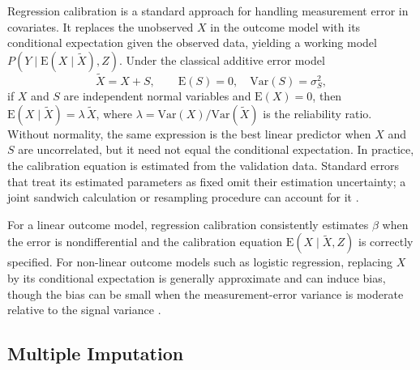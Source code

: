 Regression calibration \citep{prentice1982covariate} is a standard approach for handling measurement error in covariates. It replaces the unobserved $X$ in the outcome model with its conditional expectation given the observed data, yielding a working model $P(Y \mid \mathrm{E}(X \mid \tilde{X}), Z)$. Under the classical additive error model
\begin{equation}
    \tilde{X} = X + S, \qquad
    \mathrm{E}(S) = 0, \quad
    \mathrm{Var}(S) = \sigma_S^2,
    \label{eq:me}
\end{equation}
if $X$ and $S$ are independent normal variables and $\mathrm{E}(X)=0$, then $\mathrm{E}(X \mid \tilde{X}) = \lambda\, \tilde{X}$, where $\lambda = \mathrm{Var}(X) / \mathrm{Var}(\tilde{X})$ is the reliability ratio. Without normality, the same expression is the best linear predictor when $X$ and $S$ are uncorrelated, but it need not equal the conditional expectation. In practice, the calibration equation is estimated from the validation data. Standard errors that treat its estimated parameters as fixed omit their estimation uncertainty; a joint sandwich calculation or resampling procedure can account for it \citep{huber1967behavior, white1980heteroskedasticity}.

For a linear outcome model, regression calibration consistently estimates $\beta$ when the error is nondifferential and the calibration equation $\mathrm{E}(X \mid \tilde{X},Z)$ is correctly specified. For non-linear outcome models such as logistic regression, replacing $X$ by its conditional expectation is generally approximate and can induce bias, though the bias can be small when the measurement-error variance is moderate relative to the signal variance \citep{carroll2006measurement}.

\subsection{Multiple Imputation}
\label{sec:mi}

